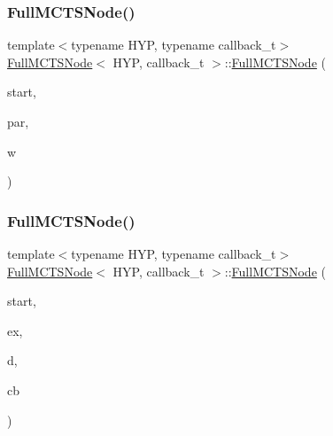 \subsubsection{\texorpdfstring{Full\+M\+C\+T\+S\+Node()}{FullMCTSNode()}\hspace{0.1cm}{\footnotesize\ttfamily [2/5]}}
{\footnotesize\ttfamily template$<$typename H\+YP, typename callback\+\_\+t$>$ \\
\hyperlink{class_full_m_c_t_s_node}{Full\+M\+C\+T\+S\+Node}$<$ H\+YP, callback\+\_\+t $>$\+::\hyperlink{class_full_m_c_t_s_node}{Full\+M\+C\+T\+S\+Node} (\begin{DoxyParamCaption}\item[{H\+YP \&}]{start,  }\item[{\hyperlink{class_full_m_c_t_s_node_afcc6a60f2d45fd1d6c4bd5f4998b147d}{this\+\_\+t} $\ast$}]{par,  }\item[{size\+\_\+t}]{w }\end{DoxyParamCaption})\hspace{0.3cm}{\ttfamily [inline]}}

\mbox{\label{class_full_m_c_t_s_node_a1962475abb800ec3214468ea5331e080}} 
\subsubsection{\texorpdfstring{Full\+M\+C\+T\+S\+Node()}{FullMCTSNode()}\hspace{0.1cm}{\footnotesize\ttfamily [3/5]}}
{\footnotesize\ttfamily template$<$typename H\+YP, typename callback\+\_\+t$>$ \\
\hyperlink{class_full_m_c_t_s_node}{Full\+M\+C\+T\+S\+Node}$<$ H\+YP, callback\+\_\+t $>$\+::\hyperlink{class_full_m_c_t_s_node}{Full\+M\+C\+T\+S\+Node} (\begin{DoxyParamCaption}\item[{H\+YP \&}]{start,  }\item[{double}]{ex,  }\item[{\hyperlink{class_full_m_c_t_s_node_a9c9c98180d9c5a799f118a79976536a6}{data\+\_\+t} $\ast$}]{d,  }\item[{callback\+\_\+t \&}]{cb }\end{DoxyParamCaption})\hspace{0.3cm}{\ttfamily [inline]}}


